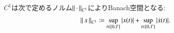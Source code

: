 \begin{comment}
\begin{prf}\mbox{}
	\begin{description}
		\item[(1)] 
			各$k,j$に対して
			\begin{align}
				\int_s^u f^k_j(x_r)\ dx^j_r
				+ \int_u^t f^k_j(x_r)\ dx^j_r
				= \int_s^t f^k_j(x_r)\ dx^j_r
				\label{eq:thm_linearity_of_Riemann_Stieltjes_integral_1}
			\end{align}
			が成り立つことを示せばよい．
			以下，分割$D$に対するRiemann和$\sum_D f^k_j(x_{t_{i-1}})(x^j_{t_i} - x^j_{t_{i-1}})$を$\Sigma_D$と略記する．
			定理\ref{thm:existence_of_Riemann_Stieltjes_integral}より，
			任意の$\epsilon > 0$に対して或る$\delta > 0$が存在し，
			\begin{align}
				|D_1|,|D_2|,|D_3| < \delta,
				\quad \left(D_1 \in \delta[s,u],\ D_2 \in \delta[u,t],\ D_3 \in \delta[s,t] \right)
			\end{align}
			である限り
			\begin{align}
				\left| \int_s^u f^k_j(x_r)\ dx^j_r - \Sigma_{D_1} \right| < \epsilon,
				\quad \left| \int_u^t f^k_j(x_r)\ dx^j_r - \Sigma_{D_2} \right| < \epsilon,
				\quad \left| \int_s^t f^k_j(x_r)\ dx^j_r - \Sigma_{D_3} \right| < \epsilon
			\end{align}
			が成立する．$|D_1|,|D_2| < \delta/2$を満たす
			$D_1,D_2$を取り$D_3$をその合併とすれば，$|D_3| < \delta$かつ
			\begin{align}
				\Sigma_{D_1} + \Sigma_{D_2} = \Sigma_{D_3}
			\end{align}
			が成り立ち，
			\begin{align}
				&\left| \int_s^u f^k_j(x_r)\ dx^j_r + \int_u^t f^k_j(x_r)\ dx^j_r
					- \int_s^t f^k_j(x_r)\ dx^j_r \right| \\
				&\qquad \leq \left| \int_s^u f^k_j(x_r)\ dx^j_r - \Sigma_{D_1} \right|
				+ \left| \int_u^t f^k_j(x_r)\ dx^j_r - \Sigma_{D_2} \right|
				+ \left| \int_s^t f^k_j(x_r)\ dx^j_r - \Sigma_{D_3} \right| \\
				&\qquad < 3\epsilon
			\end{align}
			が従い(\refeq{eq:thm_linearity_of_Riemann_Stieltjes_integral_1})を得る．
		
		\item[(2)] 略．
		\QED
	\end{description}
\end{prf}

\end{comment}
$C^1$は次で定めるノルム$\left\|\, \cdot\, \right\|_{C^1}$によりBanach空間となる:
\begin{align}
	\left\|\, x\, \right\|_{C^1} \coloneqq
	\operatorname*{sup}_{t \in [0,T]} |x(t)| + \operatorname*{sup}_{t \in [0,T]} |\dot{x}(t)|.
\end{align}

